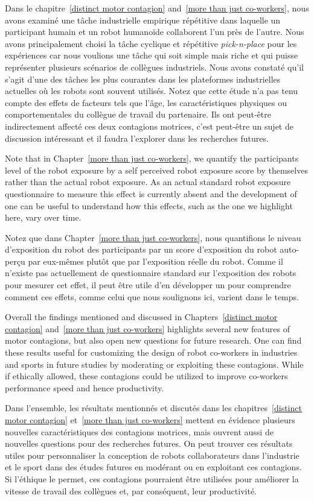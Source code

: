 Dans le chapitre~\ref{distinct motor contagion} and~\ref{more than just co-workers}, nous avons examiné une tâche industrielle empirique répétitive dans laquelle un participant humain et un robot humanoïde collaborent l'un près de l'autre. Nous avons principalement choisi la tâche cyclique et répétitive \textit{pick-n-place} pour les expériences car nous voulions une tâche qui soit simple mais riche et qui puisse représenter plusieurs scénarios de collègues industriels. Nous avons constaté qu'il s'agit d'une des tâches les plus courantes dans les plateformes industrielles actuelles où les robots sont souvent utilisés. Notez que cette étude n'a pas tenu compte des effets de facteurs tels que l'âge, les caractéristiques physiques ou comportementales du collègue de travail du partenaire. Ils ont peut-être indirectement affecté ces deux contagions motrices, c'est peut-être un sujet de discussion intéressant et il faudra l'explorer dans les recherches futures.



Note that in Chapter~\ref{more than just co-workers}, we quantify the participants level of the robot exposure by a self perceived robot exposure score by themselves rather than the actual robot exposure. As an actual standard robot exposure questionnaire to measure this effect is currently absent and the development of one can be useful to understand how this effects, such as the one we highlight here, vary over time.

Notez que dans Chapter~\ref{more than just co-workers}, nous quantifions le niveau d'exposition du robot des participants par un score d'exposition du robot auto-perçu par eux-mêmes plutôt que par l'exposition réelle du robot. Comme il n'existe pas actuellement de questionnaire standard sur l'exposition des robots pour mesurer cet effet, il peut être utile d'en développer un pour comprendre comment ces effets, comme celui que nous soulignons ici, varient dans le temps.


Overall the findings mentioned and discussed in Chapters~\ref{distinct motor contagion} and~\ref{more than just co-workers} highlights several new features of motor contagions, but also open new questions for future research. One can find these results useful for customizing the design of robot co-workers in industries and sports in future studies by moderating or exploiting these contagions. While if ethically allowed, these contagions could be utilized to improve co-workers performance speed and hence productivity.

Dans l'ensemble, les résultats mentionnés et discutés dans les chapitres~\ref{distinct motor contagion} et~\ref{more than just co-workers} mettent en évidence plusieurs nouvelles caractéristiques des contagions motrices, mais ouvrent aussi de nouvelles questions pour des recherches futures. On peut trouver ces résultats utiles pour personnaliser la conception de robots collaborateurs dans l'industrie et le sport dans des études futures en modérant ou en exploitant ces contagions. Si l'éthique le permet, ces contagions pourraient être utilisées pour améliorer la vitesse de travail des collègues et, par conséquent, leur productivité.



